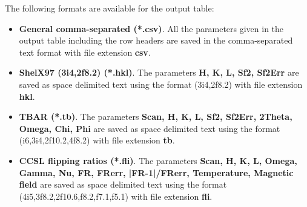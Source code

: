 The following formats are available for the output table:

\begin{itemize}
	\item \textbf{General comma-separated (*.csv)}. All the parameters given in the output table including the row headers are saved in the comma-separated text format with file extension \textbf{csv}.
	\item \textbf{ShelX97 (3i4,2f8.2) (*.hkl)}. The parameters \textbf{H, K, L, Sf2, Sf2Err} are saved as space delimited text using the format (3i4,2f8.2) with file extension \textbf{hkl}.
	\item \textbf{TBAR (*.tb)}. The parameters \textbf{Scan, H, K, L, Sf2, Sf2Err, 2Theta, Omega, Chi, Phi} are saved as space delimited text using the format (i6,3i4,2f10.2,4f8.2) with file extension \textbf{tb}.
	\item \textbf{CCSL flipping ratios (*.fli)}. The parameters \textbf{Scan, H, K, L, Omega, Gamma, Nu, FR, FRerr, |FR-1|/FRerr, Temperature, Magnetic field} are saved as space delimited text using the format (4i5,3f8.2,2f10.6,f8.2,f7.1,f5.1) with file extension \textbf{fli}.
\end{itemize}




